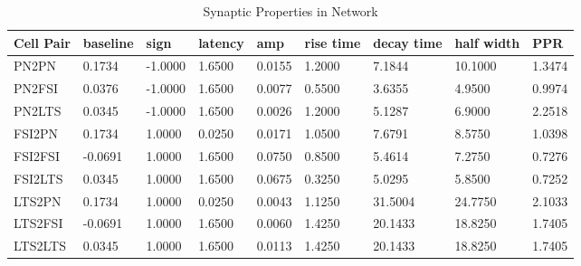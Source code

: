 \documentclass[12pt, letterpaper]{article}
\begin{document}
\begin{table}[H]
  \centering
  \caption{Synaptic Properties in Network}
  \begin{tabularx}{\textwidth}{|X|X|X|X|X|X|X|X|X|}
    \hline
    Cell Pair & baseline & sign & latency & amp & rise time & decay time & half width & PPR \\ \hline
    PN2PN & 0.1734 & -1.0000 & 1.6500 & 0.0155 & 1.2000 & 7.1844 & 10.1000 & 1.3474 \\ \hline
    PN2FSI & 0.0376 & -1.0000 & 1.6500 & 0.0077 & 0.5500 & 3.6355 & 4.9500 & 0.9974 \\ \hline
    PN2LTS & 0.0345 & -1.0000 & 1.6500 & 0.0026 & 1.2000 & 5.1287 & 6.9000 & 2.2518 \\ \hline
    FSI2PN & 0.1734 & 1.0000 & 0.0250 & 0.0171 & 1.0500 & 7.6791 & 8.5750 & 1.0398 \\ \hline
    FSI2FSI & -0.0691 & 1.0000 & 1.6500 & 0.0750 & 0.8500 & 5.4614 & 7.2750 & 0.7276 \\ \hline
    FSI2LTS & 0.0345 & 1.0000 & 1.6500 & 0.0675 & 0.3250 & 5.0295 & 5.8500 & 0.7252 \\ \hline
    LTS2PN & 0.1734 & 1.0000 & 0.0250 & 0.0043 & 1.1250 & 31.5004 & 24.7750 & 2.1033 \\ \hline
    LTS2FSI & -0.0691 & 1.0000 & 1.6500 & 0.0060 & 1.4250 & 20.1433 & 18.8250 & 1.7405 \\ \hline
    LTS2LTS & 0.0345 & 1.0000 & 1.6500 & 0.0113 & 1.4250 & 20.1433 & 18.8250 & 1.7405 \\ \hline
  \end{tabularx}
  \label{tab:syn_prop}
\end{table}
\end{document}
